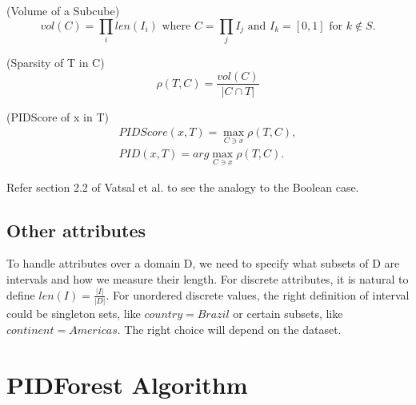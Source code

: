 \begin{defn}
    \label{defn:volume-of-subcube}
    (Volume of a Subcube)
    \vspace{-1em}
    \begin{equation}
        \label{eq:volume-of-subcube}
        vol(C) = \prod_i len(I_i) \textrm{ where } C = \prod_j I_j \textrm{ and } I_k = [0,1] \textrm{ for } k \notin S.
    \end{equation}
\end{defn}

\begin{defn}
    \label{defn:sparsity}
    (Sparsity of T in C)
    \vspace{-1em}
    \begin{equation}
        \label{eq:sparsity}
        \rho (T,C) = \frac{vol(C)}{\vert C \cap T \vert}
    \end{equation}
\end{defn}

\pagebreak

\begin{defn}
    \label{defn:pidscore}
    (PIDScore of x in T)
    \vspace{-1em}
    \begin{equation}
        \label{eq:pidscore}
        \begin{split}
            PIDScore(x,T) = \max_{C \ni x} \rho (T,C), \\
            PID(x,T) = arg \max_{C \ni x} \rho (T,C).
        \end{split}
    \end{equation}
\end{defn}

Refer section 2.2 of Vatsal et al. \cite{NIPS2019_9710} to see the analogy to the Boolean case.

\subsection{Other attributes}

To handle attributes over a domain D, we need to specify what subsets of D are intervals and how we measure their length.
For discrete attributes, it is natural to define $len(I) = \frac{\vert I \vert}{\vert D \vert}$.
For unordered discrete values, the right definition of interval could be singleton sets, like $country = Brazil$ or certain subsets, like $continent = Americas$. The right choice will depend on the dataset.


\section{PIDForest Algorithm}
\label{sec:pidforest-algorithm}

